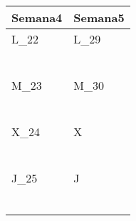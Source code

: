 	\renewcommand{\arraystretch}{1.25}\scriptsize
	\begin{longtabu} to \textwidth { X[l] X[l]}
		\centering \textbf{Semana4} &  \centering\textbf{Semana5}  \\
		\toprule
		L_{22} & L_{29} \\
		\makebox{$\square$}\dotfill & \makebox{$\square$}\dotfill \\
		\dotfill & \dotfill \\
		\makebox{$\square$}\dotfill & \makebox{$\square$}\dotfill \\
		\dotfill & \dotfill \\
		\makebox{$\square$}\dotfill & \makebox{$\square$}\dotfill \\
		\dotfill & \dotfill \\

		\hline

		M_{23} & M_{30} \\
		\makebox{$\square$}\dotfill & \makebox{$\square$}\dotfill \\
		\dotfill & \dotfill \\
		\makebox{$\square$}\dotfill & \makebox{$\square$}\dotfill \\
		\dotfill & \dotfill \\
		\makebox{$\square$}\dotfill & \makebox{$\square$}\dotfill \\
		\dotfill & \dotfill \\

		\hline

		X_{24} & X \\
		\makebox{$\square$}\dotfill &   \\
		\dotfill &   \\
		\makebox{$\square$}\dotfill &   \\
		\dotfill &   \\
		\makebox{$\square$}\dotfill &   \\
		\dotfill &   \\

		\hline

		J_{25} & J \\
		\makebox{$\square$}\dotfill &   \\
		\dotfill &   \\
		\makebox{$\square$}\dotfill &   \\
		\dotfill &   \\
		\makebox{$\square$}\dotfill &   \\
		\dotfill &   \\


\end{longtabu}
